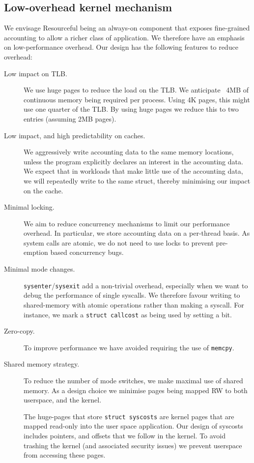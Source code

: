 \documentclass[12pt]{article}
\def\_{\textunderscore\-}
\begin{document}
  \subsection{Low-overhead kernel mechanism}
  We envisage Resourceful being an always-on component that exposes fine-grained accounting to allow a richer class of application. We therefore have an emphasis on low-performance overhead. Our design has the following features to reduce overhead:
  \begin{description}
  \item[Low impact on TLB.] We use huge pages to reduce the load on the TLB.
  We anticipate ~4MB of continuous memory being required per process. Using 4K pages, this might use one quarter of the TLB. By using huge pages we reduce this to two entries (assuming 2MB pages).

  \item[Low impact, and high predictability on caches.] We aggressively write accounting data to the same memory locations, unless the program explicitly declares an interest in the accounting data. We expect that in workloads that make little use of the accounting data, we will repeatedly write to the same struct, thereby minimising our impact on the cache.

  \item[Minimal locking.] We aim to reduce concurrency mechanisms to limit our performance overhead. In particular, we store accounting data on a per-thread basis. As system calls are atomic, we do not need to use locks to prevent pre-emption based concurrency bugs.

  \item[Minimal mode changes.] \texttt{sysenter}/\texttt{sysexit}  add a non-trivial overhead, especially when we want to debug the performance of single syscalls. We therefore favour writing to shared-memory with atomic operations rather than making a syscall. For instance, we mark a \texttt{struct call\_cost} as being used by setting a bit.

  \item[Zero-copy.] To improve performance we have avoided requiring the use of \texttt{memcpy}.

  \item[Shared memory strategy.] To reduce the number of mode switches, we make maximal use of shared memory. As a design choice we minimise pages being mapped RW to both userspace, and the kernel.

  The huge-pages that store \texttt{struct sys\_costs} are kernel pages that are mapped read-only into the user space application. Our design of sys\_costs includes pointers, and offsets that we follow in the kernel. To avoid trashing the kernel (and associated security issues) we prevent userspace from accessing these pages.


\end{description}
\end{document}
